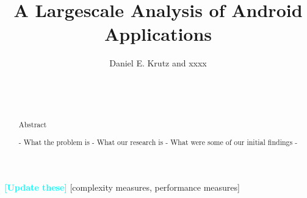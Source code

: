 \documentclass{sig-alternate}
\newcommand{\todo}[1]{\textcolor{cyan}{\textbf{[#1]}}}
\begin{document}

\title{A Largescale Analysis of Android Applications}

%
\author{
%
%
\alignauthor
Daniel E. Krutz and xxxx\\
       \\
       \\
       \\
}


\maketitle
\begin{abstract}

Abstract

- What the problem is
- What our research is
- What were some of our initial findings
-




\end{abstract}

\todo{Update these}
[complexity measures, performance measures]
\end{document}
